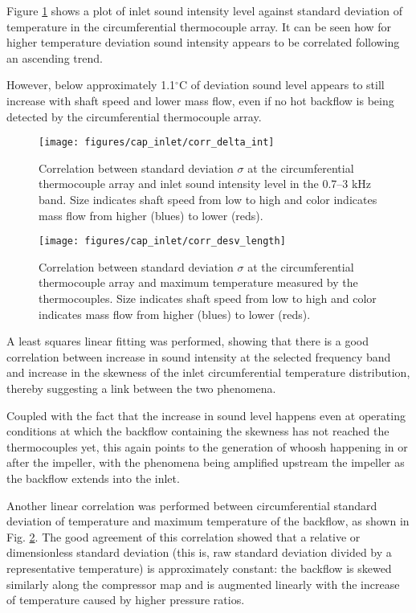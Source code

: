 Figure \ref{fig:corr1} shows a plot of inlet sound intensity level against standard deviation of temperature in the circumferential thermocouple array. It can be seen how for higher temperature deviation sound intensity appears to be correlated following an ascending trend. 

However, below approximately 1.1$^{\circ}$C of deviation sound level appears to still increase with shaft speed and lower mass flow, even if no hot backflow is being detected by the circumferential thermocouple array.

\begin{figure}[htb!]
\centering
\texttt{[image: figures/cap\_inlet/corr\_delta\_int]}
\caption{Correlation between standard deviation $\sigma$ at the circumferential thermocouple array and inlet sound intensity level in the 0.7--3 kHz band. Size indicates shaft speed from low to high and color indicates mass flow from higher (blues) to lower (reds).}
\label{fig:corr1}
\end{figure}

\begin{figure}[htb!]
\centering
\texttt{[image: figures/cap\_inlet/corr\_desv\_length]}
\caption{Correlation between standard deviation $\sigma$ at the circumferential thermocouple array and maximum temperature measured by the thermocouples. Size indicates shaft speed from low to high and color indicates mass flow from higher (blues) to lower (reds).}
\label{fig:corr2}
\end{figure}

A least squares linear fitting was performed, showing that there is a good correlation between increase in sound intensity at the selected frequency band and increase in the skewness of the inlet circumferential temperature distribution, thereby suggesting a link between the two phenomena.

Coupled with the fact that the increase in sound level happens even at operating conditions at which the backflow containing the skewness has not reached the thermocouples yet, this again points to the generation of whoosh happening in or after the impeller, with the phenomena being amplified upstream the impeller as the backflow extends into the inlet.

Another linear correlation was performed between circumferential standard deviation of temperature and maximum temperature of the backflow, as shown in Fig. \ref{fig:corr2}. The good agreement of this correlation showed that a relative or dimensionless standard deviation (this is, raw standard deviation divided by a representative temperature) is approximately constant: the backflow is skewed similarly along the compressor map and is augmented linearly with the increase of temperature caused by higher pressure ratios.

